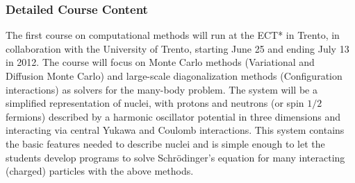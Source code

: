 \documentclass[prc,amsart,english]{revtex4}
\begin{document}
\subsubsection{Detailed Course Content}
The first course on computational methods will run at the ECT* in Trento, in collaboration with the
University of Trento, starting June 25 and ending July 13 in 2012. The course will focus on Monte Carlo
methods (Variational and Diffusion Monte Carlo) and large-scale diagonalization methods (Configuration
interactions) as solvers for the many-body problem. The system will be a simplified representation of nuclei, with protons and neutrons (or spin $1/2$ fermions) described by a harmonic oscillator potential
in three dimensions and interacting via central Yukawa and Coulomb interactions.
This system contains the basic features needed to describe nuclei and is simple enough to let the students
develop programs to solve Schr\"odinger's equation for many interacting (charged) particles with the above methods.
\end{document}
